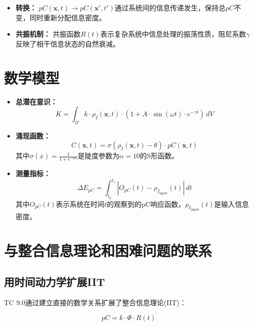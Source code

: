 \documentclass[12pt]{article}
\begin{document}
\begin{CJK}{UTF8}{gbsn}
\begin{itemize}
    \item \textbf{转换：} $pC(\mathbf{x}, t) \rightarrow pC(\mathbf{x'}, t')$通过系统间的信息传递发生，保持总$pC$不变，同时重新分配信息密度。
    
    \item \textbf{共振机制：} 共振函数$R(t)$表示复杂系统中信息处理的振荡性质，阻尼系数$\gamma$反映了相干信息状态的自然衰减。
\end{itemize}

\section{数学模型}
\begin{itemize}
    \item \textbf{总潜在意识：} 
    \begin{equation}
    K = \int_{\Omega} k \cdot \rho_I(\mathbf{x}, t) \cdot \left(1 + A \cdot \sin(\omega t) \cdot e^{-\gamma t}\right) \, dV
    \end{equation}
    
    \item \textbf{涌现函数：} 
    \begin{equation}
    C(\mathbf{x}, t) = \sigma(\rho_I(\mathbf{x}, t) - \theta) \cdot pC(\mathbf{x}, t)
    \end{equation}
    其中$\sigma(x) = \frac{1}{1 + e^{-\alpha x}}$是陡度参数为$\alpha = 10$的S形函数。
    
    \item \textbf{测量指标：} 
    \begin{equation}
    \Delta E_{pC} = \int_{t_0}^{t_1} |O_{pC}(t) - \rho_{I_{\text{input}}}(t)| \, dt
    \end{equation}
    其中$O_{pC}(t)$表示系统在时间$t$的观察到的pC响应函数，$\rho_{I_{\text{input}}}(t)$是输入信息密度。
\end{itemize}

\section{与整合信息理论和困难问题的联系}

\subsection{用时间动力学扩展IIT}
TC 9.0通过建立直接的数学关系扩展了整合信息理论(IIT)\cite{tononi2008,tononi2016}：

\begin{equation}
pC = k \cdot \Phi \cdot R(t)
\end{equation}


\end{CJK}
\end{document}
